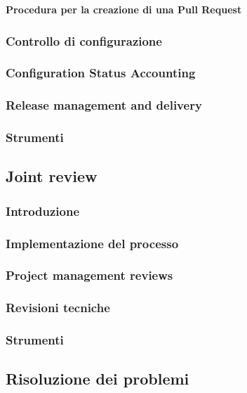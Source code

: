 \begin{itemize}

\textbf{Procedura per la creazione di una Pull Request} \label{pull_request}

\subsubsection{Controllo di configurazione}
\subsubsection{Configuration Status Accounting}
\subsubsection{Release management and delivery}
\subsubsection{Strumenti}
\subsection{Joint review}
\subsubsection{Introduzione}
\subsubsection{Implementazione del processo}
\subsubsection{Project management reviews}
\subsubsection{Revisioni tecniche}
\subsubsection{Strumenti}
\subsection{Risoluzione dei problemi}

\end{itemize}
